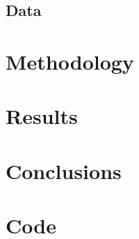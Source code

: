 \documentclass[12pt,a4paper]{report}
\begin{document}
\section{Data}


\chapter{Methodology}

\chapter{Results}

\chapter{Conclusions}

\appendix
\chapter{Code}
\label{appendix:code}



\end{document}

